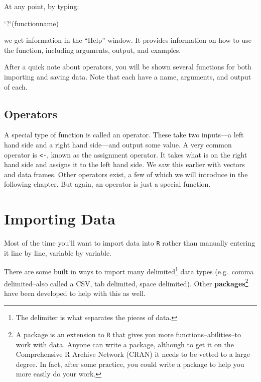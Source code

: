 \documentclass[]{tufte-book}
\newenvironment{Shaded}{}{}
\newcommand{\DataTypeTok}[1]{\textcolor[rgb]{0.56,0.13,0.00}{#1}}
\newcommand{\StringTok}[1]{\textcolor[rgb]{0.25,0.44,0.63}{#1}}
\newcommand{\NormalTok}[1]{#1}
\theoremstyle{definition}
\theoremstyle{definition}
\theoremstyle{remark}
\begin{document}
At any point, by typing:

\begin{Shaded}
\begin{Highlighting}[]
\StringTok{`}\DataTypeTok{?}\StringTok{`}\NormalTok{(functionname)}
\end{Highlighting}
\end{Shaded}

we get information in the ``Help'' window. It provides information on
how to use the function, including arguments, output, and examples.

After a quick note about operators, you will be shown several functions
for both importing and saving data. Note that each have a name,
arguments, and output of each.

\subsection*{Operators}\label{operators}

A special type of function is called an operator. These take two
inputs---a left hand side and a right hand side---and output some value.
A very common operator is \texttt{\textless{}-}, known as the assignment
operator. It takes what is on the right hand side and assigns it to the
left hand side. We saw this earlier with vectors and data frames. Other
operators exist, a few of which we will introduce in the following
chapter. But again, an operator is just a special function.

\section*{Importing Data}\label{importing-data}

Most of the time you'll want to import data into \texttt{R} rather than
manually entering it line by line, variable by variable.

There are some built in ways to import many delimited\footnote{The
  delimiter is what separates the pieces of data.} data types
(e.g.~comma delimited--also called a CSV, tab delimited, space
delimited). Other \textbf{packages}\footnote{A package is an extension
  to \texttt{R} that gives you more functions--abilities--to work with
  data. Anyone can write a package, although to get it on the
  Comprehensive R Archive Network (CRAN) it needs to be vetted to a
  large degree. In fact, after some practice, you could write a package
  to help you more easily do your work.} have been developed to help
with this as well.
\end{document}
